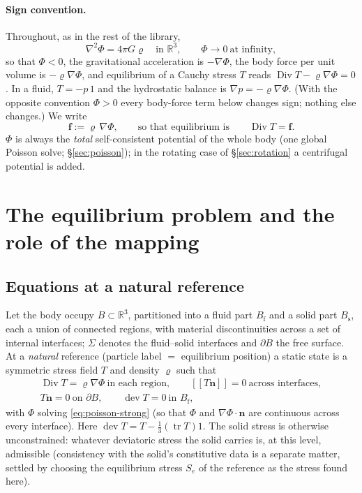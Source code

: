 \documentclass[11pt]{article}
\newcommand{\R}{\mathbb{R}}
\newcommand{\Bs}{B_{\mathrm{s}}}
\newcommand{\Bf}{B_{\mathrm{f}}}
\newcommand{\bn}{\mathbf{n}}
\newcommand{\bff}{\mathbf{f}}
\newcommand{\jump}[1]{[\![#1]\!]}
\newcommand{\tr}{\operatorname{tr}}
\newcommand{\dev}{\operatorname{dev}}
\newcommand{\Div}{\operatorname{Div}}
\begin{document}
\paragraph{Sign convention.} Throughout, as in the rest of the library,
\begin{equation}
  \nabla^{2}\Phi = 4\pi G \varrho \quad\text{in } \R^{3},
  \qquad \Phi \to 0 \ \text{at infinity},
  \label{eq:poisson-strong}
\end{equation}
so that $\Phi < 0$, the gravitational acceleration is $-\nabla\Phi$, the
body force per unit volume is $-\varrho\nabla\Phi$, and equilibrium of a
Cauchy stress $T$ reads $\Div T - \varrho\nabla\Phi = 0$. In a fluid,
$T = -p\,1$ and the hydrostatic balance is $\nabla p = -\varrho\nabla\Phi$.
(With the opposite convention $\Phi > 0$ every body-force term below
changes sign; nothing else changes.) We write
\begin{equation}
  \bff := \varrho\,\nabla\Phi ,
  \qquad\text{so that equilibrium is}\qquad \Div T = \bff .
  \label{eq:f}
\end{equation}
$\Phi$ is always the \emph{total} self-consistent potential of the
whole body (one global Poisson solve; \S\ref{sec:poisson}); in the
rotating case of \S\ref{sec:rotation} a centrifugal potential is
added.

\section{The equilibrium problem and the role of the mapping}
\label{sec:problem}

\subsection{Equations at a natural reference}

Let the body occupy $B \subset \R^{3}$, partitioned into a fluid part
$\Bf$ and a solid part $\Bs$, each a union of connected regions, with
material discontinuities across a set of internal interfaces; $\Sigma$
denotes the fluid--solid interfaces and $\partial B$ the free surface.
At a \emph{natural} reference (particle label $=$ equilibrium position)
a static state is a symmetric stress field $T$ and density $\varrho$
such that
\begin{equation}
  \begin{gathered}
  \Div T = \varrho\nabla\Phi \ \text{in each region}, \qquad
  \jump{T\bn} = 0 \ \text{across interfaces}, \\
  T\bn = 0 \ \text{on } \partial B,
  \qquad \dev T = 0 \ \text{in } \Bf ,
  \end{gathered}
  \label{eq:equilibrium}
\end{equation}
with $\Phi$ solving \eqref{eq:poisson-strong} (so that $\Phi$ and
$\nabla\Phi\cdot\bn$ are continuous across every interface). Here
$\dev T = T - \tfrac13(\tr T)1$. The solid stress is otherwise
unconstrained: whatever deviatoric stress the solid carries is, at this
level, admissible (consistency with the solid's constitutive data is a
separate matter, settled by choosing the equilibrium stress $S_e$ of the
reference as the stress found here).
\end{document}
